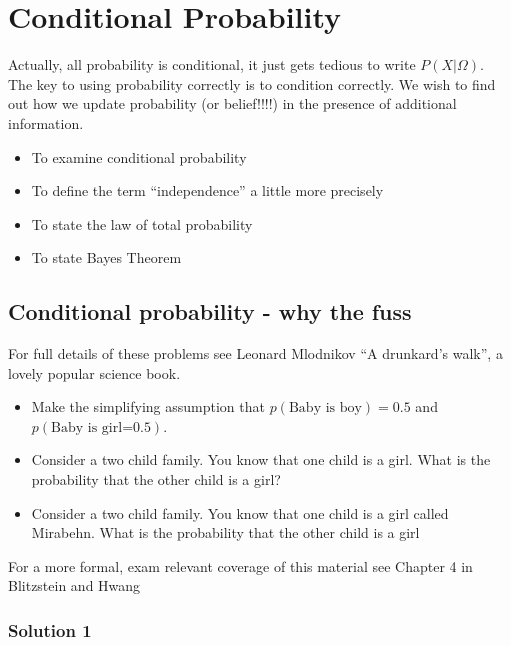 \documentclass[12pt]{extbook}
\begin{document}

\chapter{Conditional Probability}

Actually, all probability is conditional, it just gets tedious to write $P(X|\Omega)$.   The key to using probability correctly is to condition correctly.   
We wish to find out how we update probability (or belief!!!!) in the presence of additional information.

\begin{itemize}
\item To examine conditional probability
\item To define the term ``independence'' a little more precisely
\item To state the law of total probability
\item To state Bayes Theorem
\end{itemize}


% 


 

\section{Conditional probability - why the fuss}

For full details of these problems see Leonard Mlodnikov ``A drunkard's walk'', a lovely popular science book.

\begin{itemize}
\item Make the simplifying assumption that $p(\mbox{Baby is boy}) = 0.5$ and $p(\mbox{Baby is girl=0.5})$.
\item Consider a two child family.   You know that one child is a girl.   What is the probability that the other child is a girl?
\item Consider a two child family.   You know that one child is a girl called Mirabehn.   What is the probability that the other child is a girl
\end{itemize}

For a more formal, exam relevant coverage of this material see Chapter 4 in Blitzstein and Hwang

 

\subsection{Solution 1}
\end{document}
